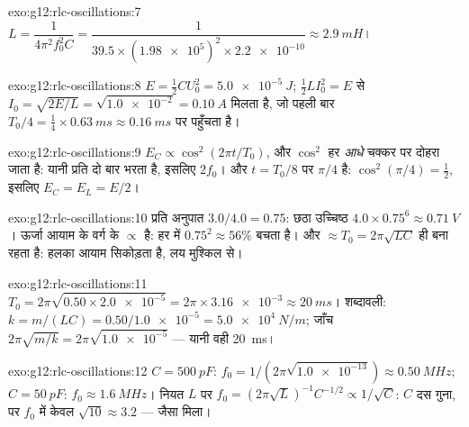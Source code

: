 \begin{solution}{exo:g12:rlc-oscillations:7}
$L = \dfrac{1}{4\pi^2 f_0^2 C} = \dfrac{1}{39.5 \times
(\num{1.98e5})^2 \times \num{2.2e-10}} \approx \qty{2.9}{mH}$।
\end{solution}

\begin{solution}{exo:g12:rlc-oscillations:8}
$E = \tfrac12 CU_0^2 = \qty{5.0e-5}{J}$; $\tfrac12 LI_0^2 = E$ से $I_0 = \sqrt{2E/L} = \sqrt{\num{1.0e-2}} = \qty{0.10}{A}$ मिलता है, जो पहली बार $T_0/4 = \tfrac14 \times \qty{0.63}{ms} \approx
\qty{0.16}{ms}$ पर पहुँचता है।
\end{solution}

\begin{solution}{exo:g12:rlc-oscillations:9}
$E_C \propto \cos^2(2\pi t/T_0)$, और $\cos^2$ हर \emph{आधे} चक्कर पर दोहरा जाता है: यानी प्रति
  दो बार भरता है, इसलिए $2f_0$। और $t = T_0/8$ पर
 $\pi/4$ है: $\cos^2(\pi/4) = \tfrac12$, इसलिए $E_C = E_L = E/2$।
\end{solution}

\begin{solution}{exo:g12:rlc-oscillations:10}
प्रति  अनुपात $3.0/4.0 = 0.75$: छठा उच्चिष्ठ $4.0 \times 0.75^6 \approx \qty{0.71}{V}$।
ऊर्जा आयाम के वर्ग के $\propto$ है: हर  में
$0.75^2 \approx 56\%$ बचता है। और  $\approx T_0 = 2\pi\sqrt{LC}$ ही बना रहता है: हलका
 आयाम सिकोड़ता है, लय मुश्किल से।
\end{solution}

\begin{solution}{exo:g12:rlc-oscillations:11}
$T_0 = 2\pi\sqrt{0.50 \times \num{2.0e-5}} = 2\pi \times
\num{3.16e-3} \approx \qty{20}{ms}$। शब्दावली: $k = m/(LC) =
0.50/\num{1.0e-5} = \qty{5.0e4}{N/m}$; जाँच $2\pi\sqrt{m/k} = 2\pi\sqrt{\num{1.0e-5}}$ --- यानी वही \qty{20}{ms}।
\end{solution}

\begin{solution}{exo:g12:rlc-oscillations:12}
$C = \qty{500}{pF}$: $f_0 = 1/(2\pi\sqrt{\num{1.0e-13}}) \approx
\qty{0.50}{MHz}$; $C = \qty{50}{pF}$: $f_0 \approx \qty{1.6}{MHz}$। नियत $L$ पर $f_0 = (2\pi\sqrt{L})^{-1} C^{-1/2} \propto 1/\sqrt{C}$: $C$ दस गुना, पर
$f_0$ में केवल $\sqrt{10} \approx 3.2$ --- जैसा मिला।
\end{solution}

